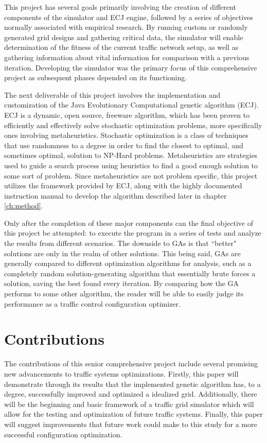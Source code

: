 This project has several goals primarily involving the creation of different components of the simulator and ECJ engine, followed by a series of objectives normally associated with empirical research.  By running custom or randomly generated grid designs and gathering critical data, the simulator will enable determination of the fitness of the current traffic network setup, as well as gathering information about vital information for comparison with a previous iteration.  Developing the simulator was the primary focus of this comprehensive project as subsequent phases depended on its functioning.

The next deliverable of this project involves the implementation and customization of the Java Evolutionary Computational genetic algorithm (ECJ).  ECJ is a dynamic, open source, freeware algorithm, which has been proven to efficiently and effectively solve stochastic optimization problems, more specifically ones involving metaheuristics.  Stochastic optimization is a class of techniques that use randomness to a degree in order to find the closest to optimal, and sometimes optimal, solution to NP-Hard problems.  Metaheuristics are strategies used to guide a search process using heuristics to find a good enough solution to some sort of problem.  Since metaheuristics are not problem specific, this project utilizes the framework provided by ECJ, along with the highly documented instruction manual to develop the algorithm described later in chapter \ref{ch:method}\cite{GAMANUAL}\cite{otherBook}. 

Only after the completion of these major components can the final objective of this project be attempted:  to execute the program in a series of tests and analyze the results from different scenarios.  The downside to GAs is that ``better" solutions are only in the realm of other solutions.  This being said, GAs are generally compared to different optimization algorithms for analysis, such as a completely random solution-generating algorithm that essentially brute forces a solution, saving the best found every iteration.  By comparing how the GA performs to some other algorithm, the reader will be able to easily judge its performance as a traffic control configuration optimizer.    

\section{Contributions}\label{sec:contributions}
The contributions of this senior comprehensive project include several promising new advancements to traffic systems optimizations.  Firstly, this paper will demonstrate through its results that the implemented genetic algorithm has, to a degree, successfully improved and optimized a idealized grid.  Additionally, there will be the beginning and basic framework of a traffic grid simulator which will allow for the testing and optimization of future traffic systems.  Finally, this paper will suggest improvements that future work could make to this study for a more successful configuration optimization.

